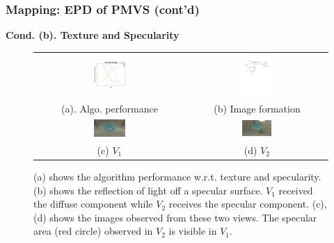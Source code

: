 \documentclass{beamer}
\begin{document}
\begin{frame}
\frametitle{Mapping: EPD of PMVS (cont'd)}

\textbf{Cond. (b). Texture and Specularity}
\begin{figure}[!htbp]
\begin{tabular}{cc}
\includegraphics[width=0.22\textwidth]{mapping/depend_check/mvs_tex_spec}&
\includegraphics[width=0.22\textwidth]{mapping/mvs_spec/mvs_spec}\\
(a). Algo. performance & (b) Image formation\\
\includegraphics[width=0.22\textwidth]{mapping/mvs_spec/mvs_spec_01}&
\includegraphics[width=0.22\textwidth]{mapping/mvs_spec/mvs_spec_00}\\
(c) $V_1$ & (d) $V_2$\\
\end{tabular}
\caption{(a) shows the algorithm performance w.r.t. texture and specularity. (b) shows the reflection of light off a specular surface. $V_1$ received the diffuse component while $V_2$ receives the specular component. (c), (d) shows the images observed from these two views. The specular area (red circle) observed in $V_2$ is visible in $V_1$.}
\end{figure}

\end{frame}
\end{document}
